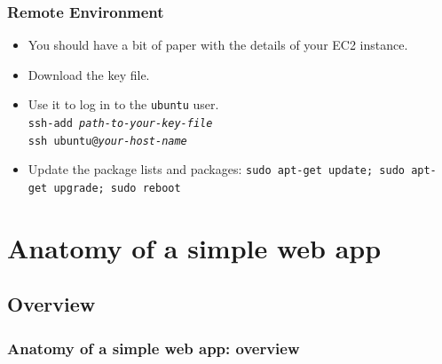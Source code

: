 \documentclass{beamer}
\begin{document}
\begin{frame}
  \frametitle{Remote Environment}
  \begin{itemize}
  \item You should have a bit of paper with the details of your EC2
    instance.
  \item Download the key file.
  \item Use it to log in to the \texttt{ubuntu} user. \\
    \texttt{ssh-add \textit{path-to-your-key-file}} \\
    \texttt{ssh ubuntu@\textit{your-host-name}}
  \item Update the package lists and packages: \texttt{sudo apt-get
      update; sudo apt-get upgrade; sudo reboot}
  \end{itemize}
\end{frame}

\section{Anatomy of a simple web app}

\subsection{Overview}

\begin{frame}
  \frametitle{Anatomy of a simple web app: overview}

  \begin{center}
  \end{center}
\end{frame} 
\end{document}
